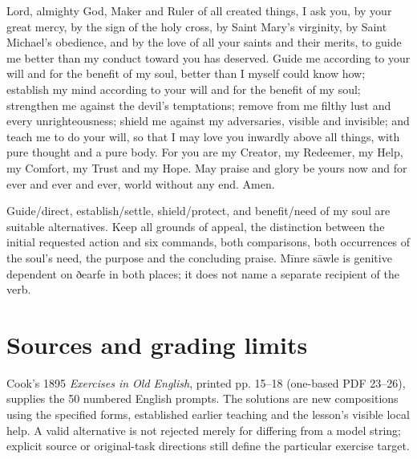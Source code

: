 \par\begin{minipage}{\linewidth}\raggedright
Lord, almighty God, Maker and Ruler of all created things, I ask you, by your great mercy, by the sign of the holy cross, by Saint Mary’s virginity, by Saint Michael’s obedience, and by the love of all your saints and their merits, to guide me better than my conduct toward you has deserved. Guide me according to your will and for the benefit of my soul, better than I myself could know how; establish my mind according to your will and for the benefit of my soul; strengthen me against the devil’s temptations; remove from me filthy lust and every unrighteousness; shield me against my adversaries, visible and invisible; and teach me to do your will, so that I may love you inwardly above all things, with pure thought and a pure body. For you are my Creator, my Redeemer, my Help, my Comfort, my Trust and my Hope. May praise and glory be yours now and for ever and ever and ever, world without any end. Amen.

Guide/\allowbreak{}direct, establish/\allowbreak{}settle, shield/\allowbreak{}protect, and benefit/\allowbreak{}need of my soul are suitable alternatives. Keep all grounds of appeal, the distinction between the initial requested action and six commands, both comparisons, both occurrences of the soul’s need, the purpose and the concluding praise. Mīnre sāwle is genitive dependent on ðearfe in both places; it does not name a separate recipient of the verb.

\end{minipage}\par\addvspace{4pt}

\section*{Sources and grading limits}

Cook’s 1895 \emph{Exercises in Old English}, printed pp. 15–18 (one-based PDF 23–26), supplies the 50 numbered English prompts. The solutions are new compositions using the specified forms, established earlier teaching and the lesson’s visible local help. A valid alternative is not rejected merely for differing from a model string; explicit source or original-task directions still define the particular exercise target.

